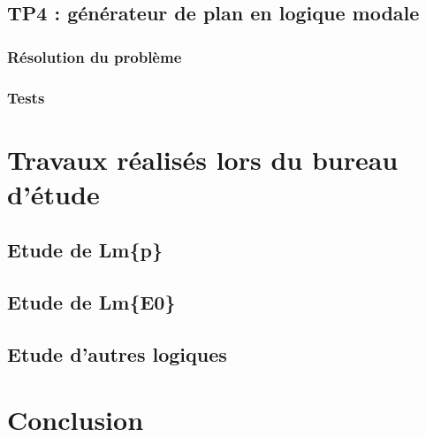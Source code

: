 \documentclass[a4paper,10pt]{article}
\begin{document}
  \subsection{TP4 : g\'{e}n\'{e}rateur de plan en logique modale}
  
   \subsubsection{R\'{e}solution du probl\`{e}me}
   \subsubsection{Tests}
   
   
 \section{Travaux r\'{e}alis\'{e}s lors du bureau d'\'{e}tude}
 
  \subsection{Etude de Lm\{p\} }
  
  \subsection{Etude de Lm\{E0\}}
  
  \subsection{Etude d'autres logiques}
  
 \section{Conclusion}
    
\end{document}

